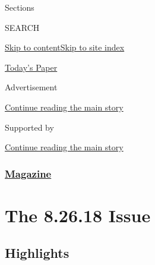 Sections

SEARCH

\protect\hyperlink{site-content}{Skip to
content}\protect\hyperlink{site-index}{Skip to site index}

\href{https://myaccount.nytimes3xbfgragh.onion/auth/login?response_type=cookie\&client_id=vi}{}

\href{https://www.nytimes3xbfgragh.onion/section/todayspaper}{Today's
Paper}

Advertisement

\protect\hyperlink{after-top}{Continue reading the main story}

Supported by

\protect\hyperlink{after-sponsor}{Continue reading the main story}

\hypertarget{magazine}{%
\subsubsection{\texorpdfstring{\href{/section/magazine}{Magazine}}{Magazine}}\label{magazine}}

\hypertarget{the-82618-issue}{%
\section{The 8.26.18 Issue}\label{the-82618-issue}}

\hypertarget{highlights}{%
\subsection{Highlights}\label{highlights}}

